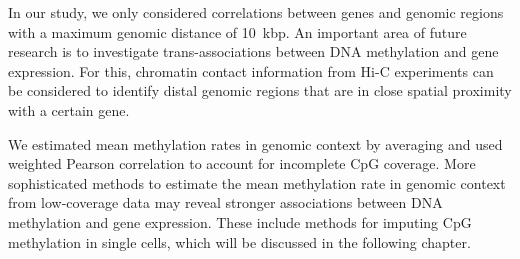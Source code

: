 In our study, we only considered correlations between genes and genomic regions with a maximum genomic distance of 10~kbp. An important area of future research is to investigate trans-associations between DNA methylation and gene expression. For this, chromatin contact information from Hi-C experiments can be considered to identify distal genomic regions that are in close spatial proximity with a certain gene.

We estimated mean methylation rates in genomic context by averaging and used weighted Pearson correlation to account for incomplete CpG coverage. More sophisticated methods to estimate the mean methylation rate in genomic context from low-coverage data may reveal stronger associations between DNA methylation and gene expression. These include methods for imputing CpG methylation in single cells, which will be discussed in the following chapter.
